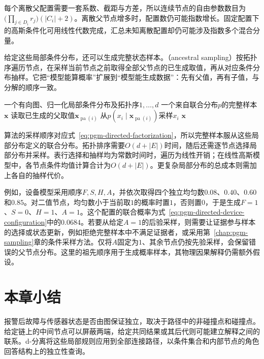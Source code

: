 每个离散父配置需要一套系数、截距与方差，所以连续节点的自由参数数目为$\bigl(\prod_{j\in D_i}r_j\bigr)(|C_i|+2)$。离散父节点增多时，配置数仍可能指数增长。固定配置下的高斯条件化可用线性代数完成，汇总未知离散配置却仍可能涉及指数多个混合分量。

给定这些局部条件分布，还可以生成完整状态样本。（ancestral sampling）按拓扑序遍历节点，在采样当前节点之前取得全部父节点的已生成取值，再从对应条件分布抽样。它把“模型能算概率”扩展到“模型能生成数据”：先有父值，再有子值，与分解的顺序一致。
\begin{algorithm}[有向图上的祖先采样]
  \label{alg:pgm-directed-ancestral-sampling}
  \begin{algorithmic}[1]
    \Require 一个有向图、归一化局部条件分布及拓扑序$1,\ldots,d$
    \Ensure 一个来自联合分布$p$的完整样本$\bm{x}$
      \State 读取已生成的父取值$\bm{x}_{\operatorname{pa}(i)}$
      \State 从$p(x_i\mid\bm{x}_{\operatorname{pa}(i)})$采样$x_i$
    \EndFor
    \State \Return $\bm{x}$
  \end{algorithmic}
\end{algorithm}
算法的采样顺序对应式~\eqref{eq:pgm-directed-factorization}，所以完整样本服从这些局部分布定义的联合分布。拓扑排序需要$O(d+|E|)$时间，随后还需逐节点选择局部分布并采样。表行选择和抽样均为常数时间时，遍历为线性开销；在线性高斯模型中，各节点条件均值计算合计为$O(d+|E|)$。更复杂局部分布的总成本则需加上各自的抽样代价。

例如，设备模型采用顺序$F,S,H,A$，并依次取得四个独立均匀数$0.08$、$0.40$、$0.60$和$0.85$。对二值节点，均匀数小于当前取$1$的概率时置$1$，否则置$0$，于是生成$F=1$、$S=0$、$H=1$、$A=1$。这个配置的联合概率为式~\eqref{eq:pgm-directed-device-configuration}中的$0.0684$。若要从给定$A=1$的后验采样，则需要让证据参与样本的选择或状态更新，例如拒绝完整样本中不满足证据者，或采用第~\ref{chap:pgm-sampling}章的条件采样方法。仅将$A$固定为$1$、其余节点仍按先验采样，会保留错误的父节点分布。这里的祖先顺序用于生成概率样本，其物理因果解释仍需额外假设。

\section{本章小结}
\label{sec:pgm-directed-summary}

报警后故障与传感器状态是否由图保证独立，取决于路径中的非碰撞点和碰撞点。给定链上的中间节点可以屏蔽两端，给定共同结果或其后代则可能建立解释之间的联系。d-分离将这些局部规则应用到全部连接路径，以条件集合和内部节点的角色回答结构上的独立性查询。

